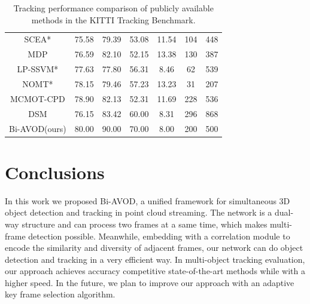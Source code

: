 \documentclass{bmvc2k}
\begin{document}
\begin{table}[]
\begin{tabular}{ccccccc}
		SCEA*         & 75.58    & 79.39    & 53.08  & 11.54  & 104 & 448  \\
		MDP           & 76.59    & 82.10    & 52.15  & 13.38  & 130 & 387  \\
		LP-SSVM*      & 77.63    & 77.80    & 56.31  & 8.46   & 62  & 539  \\
		NOMT*         & 78.15    & 79.46    & 57.23  & 13.23  & 31  & 207  \\
		MCMOT-CPD     & 78.90    & 82.13    & 52.31  & 11.69  & 228 & 536  \\
		DSM           & 76.15    & 83.42    & 60.00  & 8.31   & 296 & 868  \\ \midrule
		Bi-AVOD(ours) & 80.00    & 90.00    & 70.00  & 8.00   & 200 & 500  \\ 
		\bottomrule[1.5pt]
	\end{tabular}
	\setlength{\abovecaptionskip}{1pt}
	\caption{Tracking performance comparison of publicly available methods in the KITTI Tracking Benchmark.}
	\label{label:result_tracking}
\end{table}


\section{Conclusions}
\label{sec:conclusions} In this work we proposed Bi-AVOD, a unified framework for simultaneous 3D object detection and tracking in point cloud streaming. The network is a dual-way structure and can  process two frames at a same time, which makes multi-frame detection possible. Meanwhile, embedding with a correlation module to encode the similarity and diversity of adjacent frames, our network can do object detection and tracking in a very efficient way. In multi-object tracking evaluation, our approach achieves accuracy competitive state-of-the-art methods while with a higher speed. In the future, we plan to improve our approach with an adaptive key frame selection algorithm.


\end{document}

